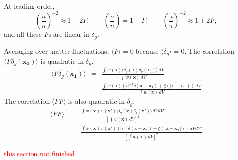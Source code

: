 \begin{subappendices}
At leading order,
\begin{equation}
  \left( \frac{\tilde n}{n} \right)^{-2} \approx 1-2F;\qquad  \left( \frac{\tilde n}{n} \right) = 1+F; \qquad  \left( \frac{\tilde n}{n} \right)^{-2} \approx 1+2F,
\end{equation}
and all these $F$s are linear in $\delta_g$.

Averaging over matter fluctuations, $\langle F\rangle = 0 $ because $\langle \delta_g \rangle = 0 $. The correlation $\langle F \delta_g(\mathbf{x_1}) \rangle$ is quadratic in $\delta_g$.
\begin{eqnarray}
  \langle F \delta_g(\mathbf{x_1}) \rangle &=&   \frac{ \int w(\mathbf x)\langle \delta_g(\mathbf x)\delta_g(\mathbf x_1) \rangle \, dV}{ \int w(\mathbf x) \, dV } \\
 &=& \frac{ \int w(\mathbf x) (n^{-1} \delta(\mathbf{x-x_1}) + \xi(|\mathbf{x-x_1}|)  )   \, dV}{ \int w(\mathbf x) \, dV }
\end{eqnarray}
The correlation $\langle F F \rangle$ is also quadratic in $\delta_g$:
\begin{eqnarray}
  \langle F F  \rangle &=& \frac{ \int w(\mathbf x)w(\mathbf x')\langle \delta_g(\mathbf x)\delta_g(\mathbf x') \rangle \, dV dV'}{ \left[ \int w(\mathbf x) \, dV \right]^2} \\
 &=& \frac{ \int w(\mathbf x)w(\mathbf x')   (n^{-1} \delta(\mathbf{x-x_1}) + \xi(|\mathbf{x-x_1}|)  )   \, dV dV'}{ \left[ \int w(\mathbf x) \, dV \right]^2}
\end{eqnarray}

\textcolor{red}{this section not finished}
 

\end{subappendices}
